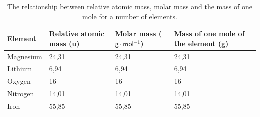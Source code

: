           \begin{table}[H]
        \begin{center}
      \label{m38717*uid11}
    \noindent
      \begin{tabular}{|l|l|l|p{3cm}|}\hline
                \textbf{Element}
               &
                \textbf{Relative atomic mass (u)}
               &
                \textbf{Molar mass ($\mathsf{g}\ensuremath{\cdot}\mathsf{mol}{}^{-1}$)}
               &
                \textbf{Mass of one mole of the element (g)} \\ \hline
        Magnesium &
        24,31 &
        24,31 &
        24,31 \\ \hline
        Lithium &
        6,94 &
        6,94 &
        6,94 \\ \hline
        Oxygen &
        16 &
        16 &
        16 \\ \hline
        Nitrogen &
        14,01 &
        14,01 &
        14,01  \\ \hline
        Iron &
        55,85 &
        55,85 &
        55,85 \\ \hline
    \end{tabular}
      \end{center}
    \caption{The relationship between relative atomic mass, molar mass and the mass of one mole for a number of elements.}
\end{table}

